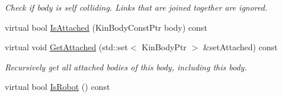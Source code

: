 \begin{DoxyCompactItemize}
\begin{DoxyCompactList}\small\item\em Check if body is self colliding. Links that are joined together are ignored. \item\end{DoxyCompactList}\item 
virtual bool \hyperlink{classOpenRAVE_1_1KinBody_a1e6636e58d5b763c37a529f752c5012d}{IsAttached} (KinBodyConstPtr body) const 
\item 
virtual void \hyperlink{classOpenRAVE_1_1KinBody_a2f50259e5dc09090474e2099dbd81cac}{GetAttached} (std::set$<$ KinBodyPtr $>$ \&setAttached) const 
\begin{DoxyCompactList}\small\item\em Recursively get all attached bodies of this body, including this body. \item\end{DoxyCompactList}\item 
\hypertarget{classOpenRAVE_1_1KinBody_a38fa8d57d2eefc36568411a129c741d3}{
virtual bool \hyperlink{classOpenRAVE_1_1KinBody_a38fa8d57d2eefc36568411a129c741d3}{IsRobot} () const }
\label{classOpenRAVE_1_1KinBody_a38fa8d57d2eefc36568411a129c741d3}


\end{DoxyCompactItemize}

